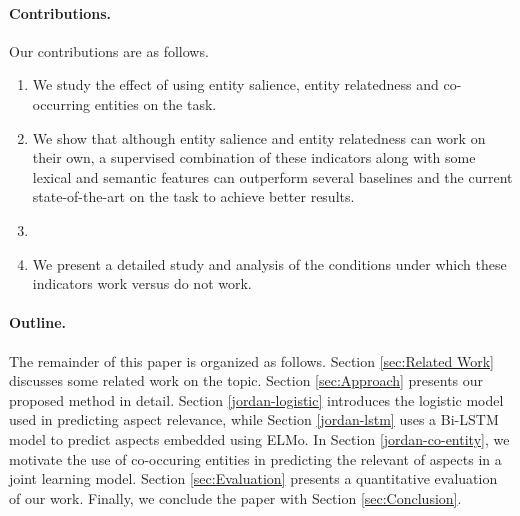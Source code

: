 

\paragraph{\textbf{Contributions.}} 


Our contributions are as follows.
\begin{enumerate}

    \item We study the effect of using entity salience, entity relatedness and co-occurring entities on the task.
    \item We show that although entity salience and entity relatedness can work on their own, a supervised combination of these indicators along with some lexical and semantic features can outperform several baselines and the current state-of-the-art on the task to achieve better results.
    \item {}
    \item We present a detailed study and analysis of the conditions under which these indicators work versus do not work. 
\end{enumerate}

\paragraph{\textbf{Outline.}} The remainder of this paper is organized as follows. Section \ref{sec:Related Work} discusses some related work on the topic. Section \ref{sec:Approach} presents our proposed method in detail. Section \ref{jordan-logistic} introduces the logistic model used in predicting aspect relevance, while Section \ref{jordan-lstm} uses a Bi-LSTM model to predict aspects embedded using ELMo. In Section \ref{jordan-co-entity}, we motivate the use of co-occuring entities in predicting the relevant of aspects in a joint learning model.  Section \ref{sec:Evaluation} presents a quantitative evaluation of our work. Finally, we conclude the paper with Section \ref{sec:Conclusion}.
